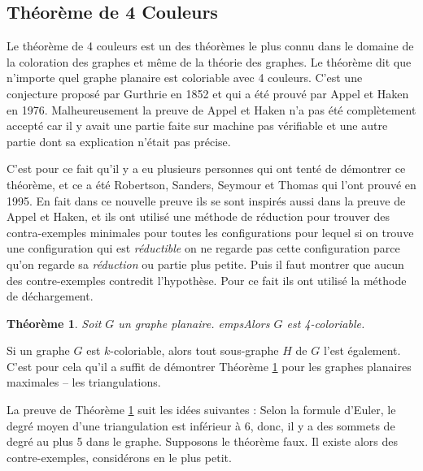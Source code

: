 \documentclass[10pt,a4paper]{article}
\newtheorem{theorem}{Théorème}
\newtheorem{proposition}{Proposition}
\begin{document}
\subsection{Théorème de 4 Couleurs}

Le théorème de 4 couleurs est un des théorèmes le plus connu dans le domaine de la coloration des graphes et même de la théorie des graphes. Le théorème dit que n'importe quel graphe planaire est coloriable avec 4 couleurs. C'est une conjecture proposé par Gurthrie en 1852 et qui a été prouvé par Appel et Haken en 1976. Malheureusement la preuve de Appel et Haken n'a pas été complètement accepté car il y avait une partie faite sur machine pas vérifiable et une autre partie dont sa explication n'était pas précise.

C'est pour ce fait qu'il y a eu plusieurs personnes qui ont tenté de démontrer ce théorème, et ce a été Robertson, Sanders, Seymour et Thomas qui l'ont prouvé en 1995. En fait dans ce nouvelle preuve ils se sont inspirés aussi dans la preuve de Appel et Haken, et ils ont utilisé une méthode de réduction pour trouver des contra-exemples minimales pour toutes les configurations pour lequel si on trouve une configuration qui est \emph{réductible} on ne regarde pas cette configuration parce qu'on regarde sa \emph{réduction} ou partie plus petite. Puis il faut montrer que aucun des contre-exemples contredit l'hypothèse. Pour ce fait ils ont utilisé la méthode de déchargement. 

\begin{theorem}
Soit $G$ un graphe planaire. empsAlors $G$ est 4-coloriable.
\label{th:4CT}
\end{theorem}

Si un graphe $G$ est $k$-coloriable, alors tout sous-graphe $H$ de $G$ l'est également. C'est pour cela qu'il a suffit de démontrer Théorème \ref{th:4CT} pour les graphes planaires maximales -- les triangulations.




La preuve de Théorème \ref{th:4CT} suit les idées suivantes : Selon la formule d'Euler, le degré moyen d'une triangulation est inférieur à 6, donc, il y a des sommets de degré au plus 5 dans le graphe. Supposons le théorème faux. Il existe alors des contre-exemples, considérons en le plus petit. 
\end{document}
